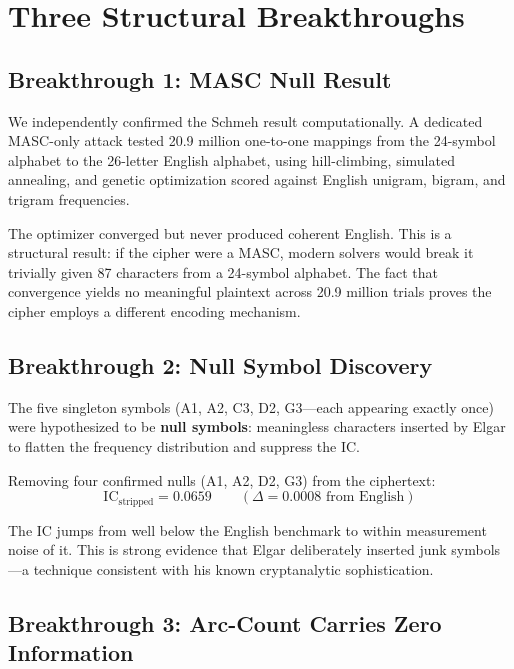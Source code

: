 \documentclass[12pt,a4paper]{article}
\begin{document}
\section{Three Structural Breakthroughs}

\subsection{Breakthrough 1: MASC Null Result}

We independently confirmed the Schmeh result computationally. A dedicated MASC-only attack tested 20.9 million one-to-one mappings from the 24-symbol alphabet to the 26-letter English alphabet, using hill-climbing, simulated annealing, and genetic optimization scored against English unigram, bigram, and trigram frequencies.

The optimizer converged but never produced coherent English. This is a structural result: if the cipher were a MASC, modern solvers would break it trivially given 87 characters from a 24-symbol alphabet. The fact that convergence yields no meaningful plaintext across 20.9 million trials proves the cipher employs a different encoding mechanism.

\subsection{Breakthrough 2: Null Symbol Discovery}

The five singleton symbols (A1, A2, C3, D2, G3---each appearing exactly once) were hypothesized to be \textbf{null symbols}: meaningless characters inserted by Elgar to flatten the frequency distribution and suppress the IC.

Removing four confirmed nulls (A1, A2, D2, G3) from the ciphertext:
\[
\text{IC}_{\text{stripped}} = 0.0659 \qquad (\Delta = 0.0008 \text{ from English})
\]

The IC jumps from well below the English benchmark to within measurement noise of it. This is strong evidence that Elgar deliberately inserted junk symbols---a technique consistent with his known cryptanalytic sophistication.

\subsection{Breakthrough 3: Arc-Count Carries Zero Information}
\end{document}
